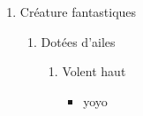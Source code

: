 \documentclass[10pt,a4paper]{scrartcl}
\begin{document}
\cite{lcfr}


\begin{enumerate}
	
	\item Créature fantastiques
	\begin{enumerate}
	
		\item Dotées d'ailes
		\begin{enumerate}
		
			\item Volent haut
			\begin{itemize}[
			
				\item yoyo				
				
			\end{itemize}					
		
		\end{enumerate}
			
	
	\end{enumerate}

\end{enumerate}
\end{document}

